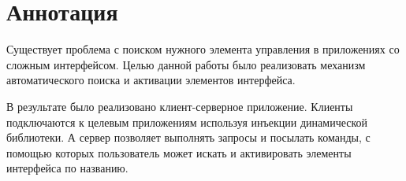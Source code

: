 \chapter*{Аннотация}

Существует проблема с поиском нужного элемента управления в приложениях со сложным интерфейсом. Целью данной работы было реализовать механизм автоматического поиска и активации элементов интерфейса.

В результате было реализовано клиент-серверное приложение. Клиенты подключаются к целевым приложениям используя инъекции динамической библиотеки. А сервер позволяет выполнять запросы и посылать команды, с помощью которых пользователь может искать и активировать элементы интерфейса по названию.
